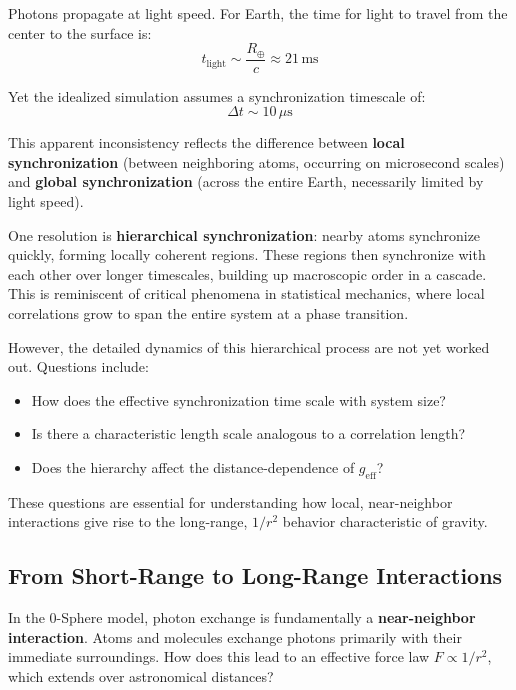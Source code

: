 \documentclass[12pt,letterpaper]{article}
\begin{document}
Photons propagate at light speed. For Earth, the time for light to travel from the center to the surface is:
\begin{equation}
t_\text{light} \sim \frac{R_\oplus}{c} \approx 21 \, \text{ms}
\end{equation}

Yet the idealized simulation assumes a synchronization timescale of:
\begin{equation}
\Delta t \sim 10 \, \mu\text{s}
\end{equation}

This apparent inconsistency reflects the difference between \textbf{local synchronization} (between neighboring atoms, occurring on microsecond scales) and \textbf{global synchronization} (across the entire Earth, necessarily limited by light speed).

One resolution is \textbf{hierarchical synchronization}: nearby atoms synchronize quickly, forming locally coherent regions. These regions then synchronize with each other over longer timescales, building up macroscopic order in a cascade. This is reminiscent of critical phenomena in statistical mechanics, where local correlations grow to span the entire system at a phase transition.

However, the detailed dynamics of this hierarchical process are not yet worked out. Questions include:
\begin{itemize}
\item How does the effective synchronization time scale with system size?
\item Is there a characteristic length scale analogous to a correlation length?
\item Does the hierarchy affect the distance-dependence of $g_\text{eff}$?
\end{itemize}

These questions are essential for understanding how local, near-neighbor interactions give rise to the long-range, $1/r^2$ behavior characteristic of gravity.

\subsection{From Short-Range to Long-Range Interactions}
\label{subsec:long_range}

In the 0-Sphere model, photon exchange is fundamentally a \textbf{near-neighbor interaction}. Atoms and molecules exchange photons primarily with their immediate surroundings. How does this lead to an effective force law $F \propto 1/r^2$, which extends over astronomical distances?
\end{document}
